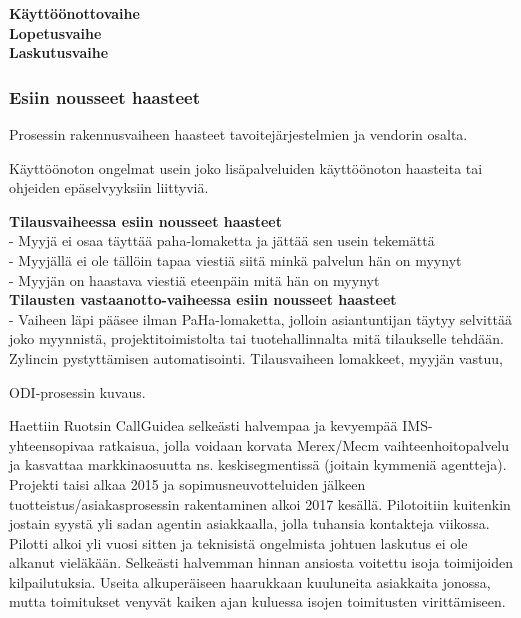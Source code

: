 \documentclass[finnish,12pt,a4paper,pdftex]{article}
\begin{document}
\textbf{Käyttöönottovaihe}\\

\textbf{Lopetusvaihe}\\

\textbf{Laskutusvaihe}\\

\subsubsection{Esiin nousseet haasteet}

Prosessin rakennusvaiheen haasteet tavoitejärjestelmien ja vendorin osalta.


Käyttöönoton ongelmat usein joko lisäpalveluiden käyttöönoton haasteita tai ohjeiden epäselvyyksiin liittyviä. 


\textbf{Tilausvaiheessa esiin nousseet haasteet}\\

- Myyjä ei osaa täyttää paha-lomaketta ja jättää sen usein tekemättä\\
- Myyjällä ei ole tällöin tapaa viestiä siitä minkä palvelun hän on myynyt\\
- Myyjän on haastava viestiä eteenpäin mitä hän on myynyt\\

\textbf{Tilausten vastaanotto-vaiheessa esiin nousseet haasteet}\\

- Vaiheen läpi pääsee ilman PaHa-lomaketta, jolloin asiantuntijan täytyy selvittää joko myynnistä, projektitoimistolta tai tuotehallinnalta mitä tilaukselle tehdään.\\

Zylincin pystyttämisen automatisointi. Tilausvaiheen lomakkeet, myyjän vastuu, 

ODI-prosessin kuvaus.

Haettiin Ruotsin CallGuidea selkeästi halvempaa ja kevyempää IMS-yhteensopivaa ratkaisua, jolla voidaan korvata Merex/Mecm vaihteenhoitopalvelu ja kasvattaa markkinaosuutta ns. keskisegmentissä (joitain kymmeniä agentteja). Projekti taisi alkaa 2015 ja sopimusneuvotteluiden jälkeen tuotteistus/asiakasprosessin rakentaminen alkoi 2017 kesällä. Pilotoitiin kuitenkin jostain syystä yli sadan agentin asiakkaalla, jolla tuhansia kontakteja viikossa. Pilotti alkoi yli vuosi sitten ja teknisistä ongelmista johtuen laskutus ei ole alkanut vieläkään. Selkeästi halvemman hinnan ansiosta voitettu isoja toimijoiden kilpailutuksia. Useita alkuperäiseen haarukkaan kuuluneita asiakkaita jonossa, mutta toimitukset venyvät kaiken ajan kuluessa isojen toimitusten virittämiseen.
\end{document}
